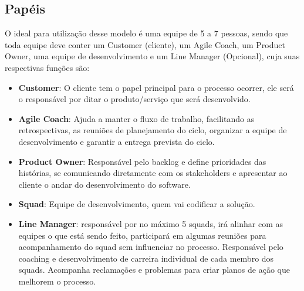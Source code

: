 \documentclass[	DIV=calc,%
							paper=a4,%
							fontsize=12pt,%
							onecolumn]{scrartcl}	 					%
\begin{document}
\subsection{Papéis}
O ideal para utilização desse modelo é uma equipe de 5 a 7 pessoas, sendo que toda equipe deve conter um Customer (cliente), um Agile Coach, um Product Owner, uma equipe de desenvolvimento e um Line Manager (Opcional), cuja suas respectivas funções são: 
\begin{itemize}
	\item \textbf{Customer}: O cliente tem o papel principal para o processo ocorrer, ele será o responsável por ditar o produto/serviço que será desenvolvido.
	\item \textbf{Agile Coach}: Ajuda a manter o fluxo de trabalho, facilitando as retrospectivas, as reuniões de planejamento do ciclo, organizar a equipe de desenvolvimento e garantir a entrega prevista do ciclo. 
	
	\item \textbf{Product Owner}: Responsável pelo backlog e define prioridades das histórias, se comunicando diretamente com os stakeholders e apresentar ao cliente o andar do desenvolvimento do software. 
	
	\item \textbf{Squad}: Equipe de desenvolvimento, quem vai codificar a solução.
	
	\item \textbf{Line Manager}: responsável por no máximo 5 squads, irá alinhar com as equipes o que está sendo feito, participará em algumas reuniões para acompanhamento do squad sem influenciar no processo. Responsável pelo coaching e desenvolvimento de carreira individual de cada membro dos squads. Acompanha reclamações e problemas para criar planos de ação que melhorem o processo. 
\end{itemize}
\end{document}
